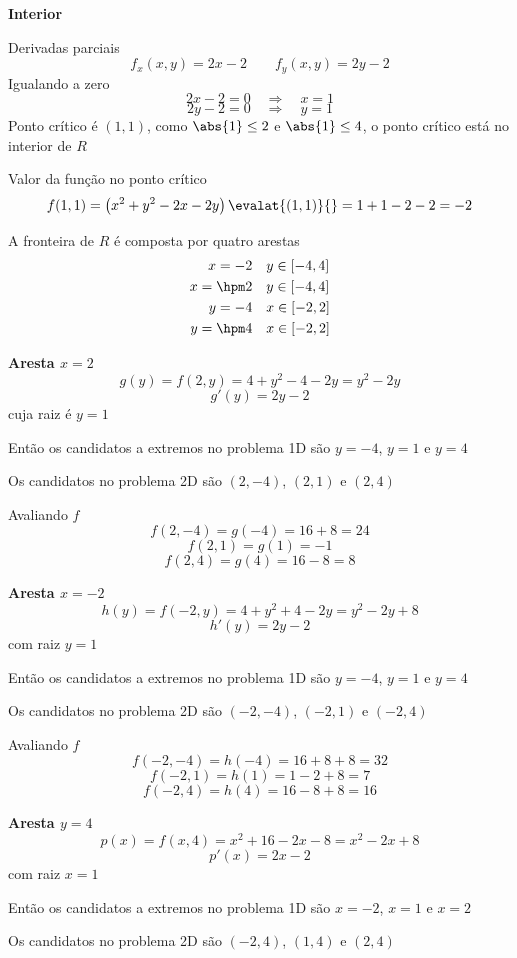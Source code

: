 \documentclass[a4paper,12pt,fleqn]{article}
\begin{document}
\begin{answer}
\textbf{Interior}

Derivadas parciais
\[
  f_x(x, y) = 2x - 2 \qquad
  f_y(x, y) = 2y - 2
\]
Igualando a zero
\[
  2x-2=0\quad\Rightarrow\quad x=1
\]
\[
  2y-2=0\quad\Rightarrow\quad y=1
\]
Ponto crítico é $(1, 1)$, como \(\abs{1}\le 2\) e \(\abs{1}\le 4\),
o ponto crítico está no interior de $R$

Valor da função no ponto crítico
\[
  f(1, 1)
  = \left(x^2 + y^2 - 2x - 2y\right) \evalat{(1, 1)}{}
  = 1 + 1 - 2 - 2
  = -2
\]

\bigskip
A fronteira de \(R\) é composta por quatro arestas
\begin{align*}
  x = -2     & \quad y\in[-4, 4] \\
  x = \hpm 2 & \quad y\in[-4, 4] \\
  y = - 4    & \quad x\in[-2, 2] \\
  y = \hpm 4 & \quad x\in[-2, 2]
\end{align*}


\bigskip
\textbf{Aresta \(x=2\)}
\[
  g(y)
  = f(2, y)
  = 4 + y^2 - 4 - 2y
  = y^2 - 2y
\]
\[
  g'(y) = 2y - 2
\]
cuja raiz é \(y=1\)

Então os candidatos a extremos no problema 1D são $y=-4$, $y=1$ e $y=4$

Os candidatos no problema 2D são $(2, -4)$, $(2, 1)$ e $(2, 4)$

Avaliando $f$
\[
  f(2, -4)
  = g(-4)
  = 16+8
  = 24
\]
\[
  f(2, 1)
  = g(1)
  = -1
\]
\[
  f(2, 4)
  = g(4)
  = 16-8
  = 8
\]


\bigskip
\textbf{Aresta \(x=-2\)}
\[
  h(y)
  = f(-2,y)
  = 4+y^{2}+4-2y
  = y^{2}-2y+8
\]
\[
  h'(y)=2y-2
\]
com raiz \(y=1\)

Então os candidatos a extremos no problema 1D são $y=-4$, $y=1$ e $y=4$

Os candidatos no problema 2D são $(-2, -4)$, $(-2, 1)$ e $(-2, 4)$

Avaliando $f$
\[
  f(-2, -4)
  = h(-4)
  = 16 + 8 + 8
  = 32
\]
\[
  f(-2, 1)
  = h(1)
  = 1 - 2 + 8
  = 7
\]
\[
  f(-2, 4)
  = h(4)
  = 16 - 8 + 8
  = 16
\]


\bigskip
\textbf{Aresta \(y=4\)}
\[
  p(x)
  = f(x, 4)
  = x^{2}+16-2x-8
  = x^{2}-2x+8
\]
\[
  p'(x)=2x-2
\]
com raiz \(x=1\)

Então os candidatos a extremos no problema 1D são $x=-2$, $x=1$ e $x=2$

Os candidatos no problema 2D são $(-2, 4)$, $(1, 4)$ e $(2, 4)$


\end{answer}
\end{document}
